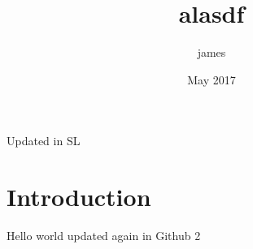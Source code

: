 \documentclass{article}
\title{alasdf}
\author{james }
\date{May 2017}
\begin{document}
\maketitle

Updated in SL

\section{Introduction}

Hello world updated again in Github 2
\end{document}
